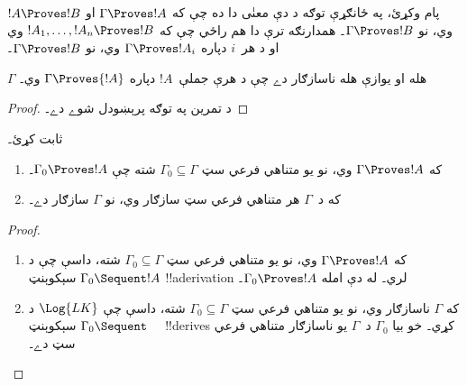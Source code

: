 \documentclass[../../../include/open-logic-section]{subfiles}
\begin{document}
پام وکړئ، په ځانګړې توګه د دې معنٰی دا ده چې که
$\Gamma \Proves !A$ او $!A \Proves !B$ وي، نو
$\Gamma \Proves !B$۔ همدارنګه ترې دا هم راځي چې که
$!A_1, \dots, !A_n \Proves !B$ وي او د هر~$i$ دپاره
$\Gamma \Proves !A_i$ وي، نو $\Gamma \Proves !B$۔

\begin{prop}
$\Gamma$ هله او يوازې هله ناسازګار دے چې د هرې جملې~$!A$ دپاره
$\Gamma \Proves {!A}$ وي۔
\end{prop}

\begin{proof}
د تمرين په توګه پرېښودل شوے دے۔
\end{proof}

\begin{prob}
 ثابت کړئ۔
\end{prob}

\begin{prop}
  \begin{enumerate}
  \item که $\Gamma \Proves !A$ وي، نو يو متناهي فرعي سټ
    $\Gamma_0 \subseteq \Gamma$ شته چې $\Gamma_0 \Proves !A$۔
  \item که د~$\Gamma$ هر متناهي فرعي سټ سازګار وي، نو $\Gamma$
    سازګار دے۔
  \end{enumerate}
\end{prop}

\begin{proof}
  \begin{enumerate}
    \item که $\Gamma \Proves !A$ وي، نو يو متناهي فرعي سټ
      $\Gamma_0 \subseteq \Gamma$ شته، داسې چې د
      $\Gamma_0 \Sequent !A$ سېکوېنټ !!a{derivation} لري۔ له دې امله
      $\Gamma_0 \Proves !A$۔
    \item که $\Gamma$ ناسازګار وي، نو يو متناهي فرعي سټ
      $\Gamma_0 \subseteq \Gamma$ شته، داسې چې $\Log{LK}$ د
      $\Gamma_0 \Sequent \quad$ سېکوېنټ !!{derive}s کړي۔ خو بيا
      $\Gamma_0$ د~$\Gamma$ يو ناسازګار متناهي فرعي سټ دے۔
  \end{enumerate}
\end{proof}
\end{document}
